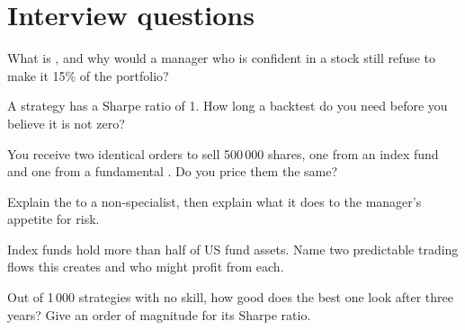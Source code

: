 \section{Interview questions}

\begin{interviewq}\label{iq:m1:the-buy-side:1}
What is , and why would a manager who is confident in a stock
still refuse to make it 15\% of the portfolio?
\end{interviewq}

\begin{interviewq}\label{iq:m1:the-buy-side:2}
A strategy has a Sharpe ratio of 1. How long a backtest do you need before
you believe it is not zero?
\end{interviewq}

\begin{interviewq}\label{iq:m1:the-buy-side:3}
You receive two identical orders to sell 500\,000 shares, one from an index
fund and one from a fundamental . Do you price them the same?
\end{interviewq}

\begin{interviewq}\label{iq:m1:the-buy-side:4}
Explain the  to a non-specialist, then explain what it does
to the manager's appetite for risk.
\end{interviewq}

\begin{interviewq}\label{iq:m1:the-buy-side:5}
Index funds hold more than half of US fund assets. Name two predictable
trading flows this creates and who might profit from each.
\end{interviewq}

\begin{interviewq}\label{iq:m1:the-buy-side:6}
Out of 1\,000 strategies with no skill, how good does the best one look
after three years? Give an order of magnitude for its Sharpe ratio.
\end{interviewq}
